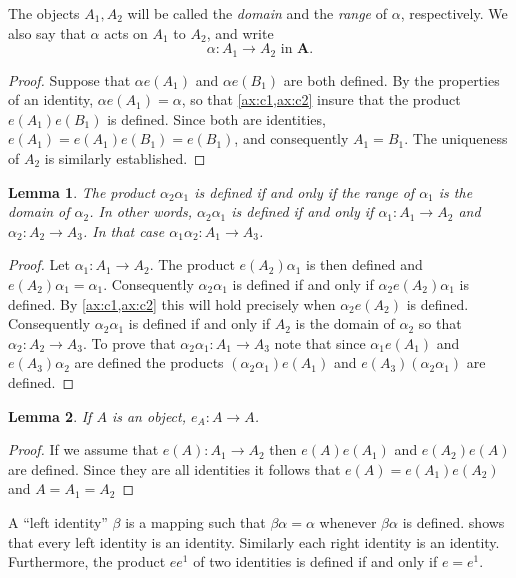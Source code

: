 \documentclass[11pt,a4paper]{report}
\newtheorem{lemma}{Lemma}
\begin{document}
The objects $A_1,A_2$ will be called the \emph{domain} and the \emph{range} of $\alpha$, respectively. We also say
that $\alpha$ acts on $A_1$ to $A_2$, and write
\begin{equation*}
	\alpha: A_1\rightarrow A_2 \text{ in }\mathbf{A}.
\end{equation*}
\begin{proof}
	Suppose that $\alpha e(A_1)$ and $\alpha e(B_1)$ are both defined. By the properties of an identity,
	$\alpha e(A_1)=\alpha$, so that \cref{ax:c1,ax:c2} insure that the product $e(A_1)e(B_1)$ is defined.
	Since both are identities, $e(A_1)=e(A_1)e(B_1)=e(B_1)$, and consequently $A_1=B_1$. The uniqueness of
	$A_2$ is similarly established.
\end{proof}
\begin{lemma}
	The product $\alpha_2\alpha_1$ is defined if and only if the range of $\alpha_1$ is the domain of
	$\alpha_2$. In other words, $\alpha_2\alpha_1$ is defined if and only if $\alpha_1 :A_1 \rightarrow
	A_2$ and $\alpha_2 :A_2 \rightarrow A_3$. In that case $\alpha_1\alpha_2:A_1\rightarrow A_3$.
\end{lemma}
\begin{proof}
	Let $\alpha_1:A_1\rightarrow A_2$. The product $e(A_2)\alpha_1$ is then defined and $e(A_2)\alpha_1=\alpha_1$.
	Consequently $\alpha_2\alpha_1$ is defined if and only if $\alpha_2 e(A_2)\alpha_1$ is defined. By \cref{ax:c1,ax:c2}
	this will hold precisely when $\alpha_2 e(A_2)$ is defined. Consequently $\alpha_2\alpha_1$ is 
	defined if and only if $A_2$ is the domain of $\alpha_2$ so that $\alpha_2 :A_2\rightarrow A_3$. To prove
	that $\alpha_2\alpha_1 :A_1 \rightarrow A_3$ note that since $\alpha_1 e(A_1)$ and $e(A_3)\alpha_2$ are defined
	the products $(\alpha_2\alpha_1)e(A_1)$ and $e(A_3)(\alpha_2\alpha_1)$ are defined.
\end{proof}
\begin{lemma}
	If $A$ is an object, $e_A:A\rightarrow A$.
\end{lemma}
\begin{proof}
	If we assume that $e(A):A_1\rightarrow A_2$ then $e(A)e(A_1)$ and $e(A_2)e(A)$ are defined. Since they are all
	identities it follows that $e(A)=e(A_1)e(A_2)$ and $A=A_1=A_2$
\end{proof}

A ``left identity'' $\beta$ is a mapping such that $\beta\alpha=\alpha$ whenever $\beta\alpha$ is defined.  shows
that every left identity is an identity. Similarly each right identity is an identity. Furthermore, the product $e e^1$ of
two identities is defined if and only if $e=e^1$.
\end{document}
